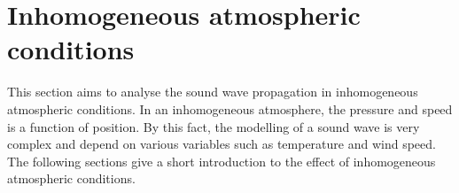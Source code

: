  
%
%


 
\section{Inhomogeneous atmospheric conditions} 
This section aims to analyse the sound wave propagation in inhomogeneous atmospheric conditions. In an inhomogeneous atmosphere, the pressure and speed is a function of position. By this fact, the modelling of a sound wave is very complex and depend on various variables such as temperature and wind speed. The following sections give a short introduction to the effect of inhomogeneous atmospheric conditions. 
 
 

